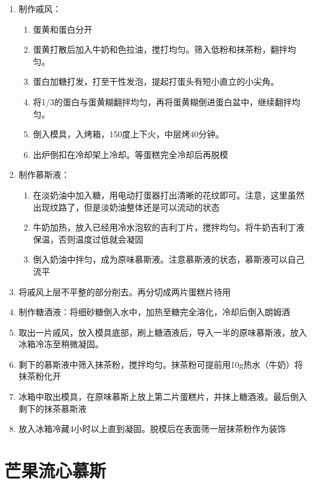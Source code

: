 \begin{enumerate}
    \item 制作戚风：
    \begin{enumerate}
    \item 蛋黄和蛋白分开
    \item 蛋黄打散后加入牛奶和色拉油，搅打均匀。筛入低粉和抹茶粉，翻拌均匀。
    \item 蛋白加糖打发，打至干性发泡，提起打蛋头有短小直立的小尖角。
    \item 将1/3的蛋白与蛋黄糊翻拌均匀，再将蛋黄糊倒进蛋白盆中，继续翻拌均匀。
    \item 倒入模具，入烤箱，150度上下火，中层烤40分钟。
    \item 出炉倒扣在冷却架上冷却。等蛋糕完全冷却后再脱模
    \end{enumerate}
    \item 制作慕斯液：
    \begin{enumerate}
    \item 在淡奶油中加入糖，用电动打蛋器打出清晰的花纹即可。注意，这里虽然出现纹路了，但是淡奶油整体还是可以流动的状态
    \item 牛奶加热，放入已经用冷水泡软的吉利丁片，搅拌均匀。将牛奶吉利丁液保温，否则温度过低就会凝固
    \item 倒入奶油中拌匀，成为原味慕斯液。注意慕斯液的状态，慕斯液可以自己流平
    \end{enumerate}

    \item 将戚风上层不平整的部分削去。再分切成两片蛋糕片待用
    \item 制作糖酒液：将细砂糖倒入水中，加热至糖完全溶化，冷却后倒入朗姆酒
    \item 取出一片戚风，放入模具底部，刷上糖酒液后，导入一半的原味慕斯液，放入冰箱冷冻至稍微凝固。
    \item 剩下的慕斯液中筛入抹茶粉，搅拌均匀。抹茶粉可提前用10g热水（牛奶）将抹茶粉化开
    \item 冰箱中取出模具，在原味慕斯上放上第二片蛋糕片，并抹上糖酒液。最后倒入剩下的抹茶慕斯液
    \item 放入冰箱冷藏4小时以上直到凝固。脱模后在表面筛一层抹茶粉作为装饰
 
\end{enumerate}



\section{芒果流心慕斯}

